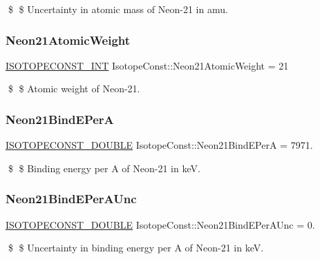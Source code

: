 \$ \$ Uncertainty in atomic mass of Neon-\/21 in amu. \mbox{\label{group___isotope_const-_neon-_ne21_gaf8c7997ad769bca85c2af3d4b393e5b0}} 
\subsubsection{\texorpdfstring{Neon21\+Atomic\+Weight}{Neon21AtomicWeight}}
{\footnotesize\ttfamily \mbox{\hyperlink{group___isotope_const-_macros_ga5f18360b3e99483a35c32d789e62621c}{I\+S\+O\+T\+O\+P\+E\+C\+O\+N\+S\+T\+\_\+\+I\+NT}} Isotope\+Const\+::\+Neon21\+Atomic\+Weight = 21}

\$ \$ Atomic weight of Neon-\/21. \mbox{\label{group___isotope_const-_neon-_ne21_gae91630624113d72de2e8ad7753500b18}} 
\subsubsection{\texorpdfstring{Neon21\+Bind\+E\+PerA}{Neon21BindEPerA}}
{\footnotesize\ttfamily \mbox{\hyperlink{group___isotope_const-_macros_ga8f45a7272ce02c0b4c65c44636ed719a}{I\+S\+O\+T\+O\+P\+E\+C\+O\+N\+S\+T\+\_\+\+D\+O\+U\+B\+LE}} Isotope\+Const\+::\+Neon21\+Bind\+E\+PerA = 7971.}

\$ \$ Binding energy per A of Neon-\/21 in keV. \mbox{\label{group___isotope_const-_neon-_ne21_ga054fe4fc00c23918d07839628f46ed7d}} 
\subsubsection{\texorpdfstring{Neon21\+Bind\+E\+Per\+A\+Unc}{Neon21BindEPerAUnc}}
{\footnotesize\ttfamily \mbox{\hyperlink{group___isotope_const-_macros_ga8f45a7272ce02c0b4c65c44636ed719a}{I\+S\+O\+T\+O\+P\+E\+C\+O\+N\+S\+T\+\_\+\+D\+O\+U\+B\+LE}} Isotope\+Const\+::\+Neon21\+Bind\+E\+Per\+A\+Unc = 0.}

\$ \$ Uncertainty in binding energy per A of Neon-\/21 in keV. \mbox{\label{group___isotope_const-_neon-_ne21_ga76d32f098400ad56b19a82692854cae7}} 
